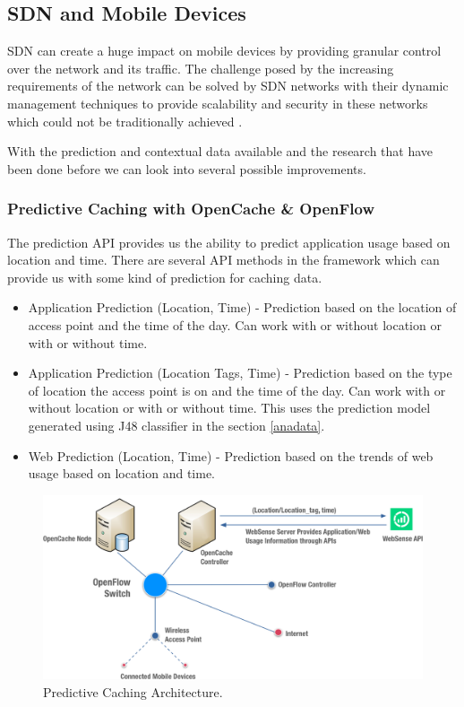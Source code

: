 \documentclass[prodmode,acmtecs]{acmsmall}
\begin{document}
\subsection{SDN and Mobile Devices}

SDN can create a huge impact on mobile devices by providing granular control over the network and its traffic. The challenge posed by the increasing requirements of the network can be solved by SDN networks with their dynamic management techniques to provide scalability and security in these networks which could not be traditionally achieved \cite{openflow2013}.

With the prediction and contextual data available and the research that have been done before we can look into several possible improvements.

\subsubsection{Predictive Caching with OpenCache \& OpenFlow}
The prediction API provides us the ability to predict application usage based on location and time. There are several API methods in the framework which can provide us with some kind of prediction for caching data.

\begin{itemize}
\item Application Prediction (Location, Time) - Prediction based on the location of access point and the time of the day. Can work with or without location or with or without time.
\item Application Prediction (Location Tags, Time) - Prediction based on the type of location the access point is on and the time of the day. Can work with or without location or with or without time. This uses the prediction model generated using J48 classifier in the section \ref{anadata}.
\item Web Prediction (Location, Time) - Prediction based on the trends of web usage based on location and time.
\end{itemize}

\begin{figure}[bhtp]
 \centering
 \includegraphics[width=120mm]{openflow-1.png}
  \caption {Predictive Caching Architecture.}
 \label{fig:openflowarch1}
\end{figure}
\end{document}

